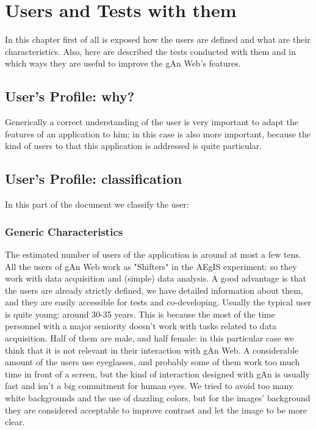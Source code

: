 
\chapter{Users and Tests with them} %

\label{Chapter7} %

In this chapter first of all is exposed how the users are defined and what are their characteristics. Also, here are described the tests conducted with them and in which ways they are useful to improve the gAn Web's features.   

\section{User's Profile: why?}

Generically a correct understanding of the user is very important to adapt the features of an application to him; in this case is also more important, because the kind of users to that this application is addressed is quite particular.


\section{User's Profile: classification}
In this part of the document we classify the user:

\subsection{Generic Characteristics}
The estimated number of users of the application is around at most a few tens.
All the users of gAn Web work as "Shifters" in the AEgIS experiment: so they work with data acquisition and (simple) data analysis.
A good advantage is that the users are already strictly defined, we have detailed information about them, and they are easily accessible for tests and co-developing.
Usually the typical user is quite young: around 30-35 years. This is because the most of the time personnel with a major seniority doesn't work with tasks related to data acquisition. 
Half of them are male, and half female: in this particular case we think that it is not relevant in their interaction with gAn Web.
A considerable amount of the users use eyeglasses, and probably some of them work too much time in front of a screen, but the kind of interaction designed with gAn is usually fast and isn't a big commitment for human eyes. We tried to avoid too many white backgrounds and the use of dazzling colors, but for the images' background they are considered acceptable to improve contrast and let the image to be more clear.  

